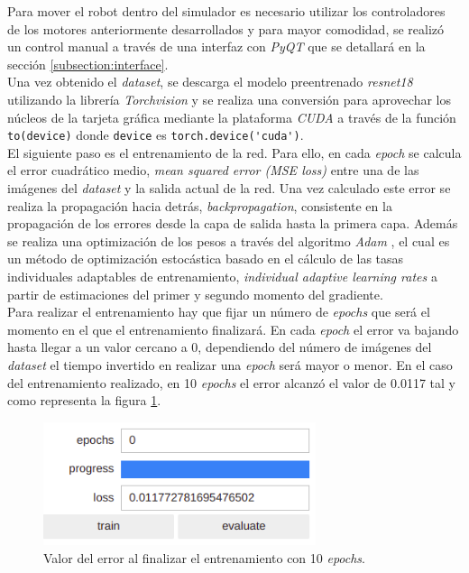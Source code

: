 Para mover el robot dentro del simulador es necesario utilizar los controladores de los motores anteriormente desarrollados y para mayor comodidad, se realizó un control manual a través de una interfaz con \textit{PyQT} que se detallará en la sección \ref{subsection:interface}.\\

Una vez obtenido el \textit{dataset}, se descarga el modelo preentrenado \textit{resnet18} utilizando la librería \textit{Torchvision} y se realiza una conversión para aprovechar los núcleos de la tarjeta gráfica mediante la plataforma \textit{CUDA} a través de la función \verb|to(device)| donde \verb|device| es \verb|torch.device('cuda')|.\\ 


El siguiente paso es el entrenamiento de la red. Para ello, en cada \textit{epoch} se calcula el error cuadrático medio, \textit{mean squared error (MSE loss)} entre una de las imágenes del \textit{dataset} y la salida actual de la red. Una vez calculado este error se realiza la propagación hacia detrás, \textit{backpropagation}, consistente en la propagación de los errores desde la capa de salida hasta la primera capa. Además se realiza una optimización de los pesos a través del algoritmo \textit{Adam} \cite{adam}, el cual es un método de optimización estocástica basado en el cálculo de las tasas individuales adaptables de entrenamiento, \textit{individual adaptive learning rates} a partir de estimaciones del primer y segundo momento del gradiente.\\

Para realizar el entrenamiento hay que fijar un número de \textit{epochs} que será el momento en el que el entrenamiento finalizará. En cada \textit{epoch} el error va bajando hasta llegar a un valor cercano a 0, dependiendo del número de imágenes del \textit{dataset} el tiempo invertido en realizar una \textit{epoch} será mayor o menor. En el caso del entrenamiento realizado, en 10 \textit{epochs} el error alcanzó el valor de 0.0117 tal y como representa la figura \ref{fig:epochsimulator}.\\

\begin{figure} [h!]
	\begin{center}
		\includegraphics[width=8cm]{figs/epochSimulator}
	\end{center}
	\caption{Valor del error al finalizar el entrenamiento con 10 \textit{epochs}.}
	\label{fig:epochsimulator}
\end{figure}\


